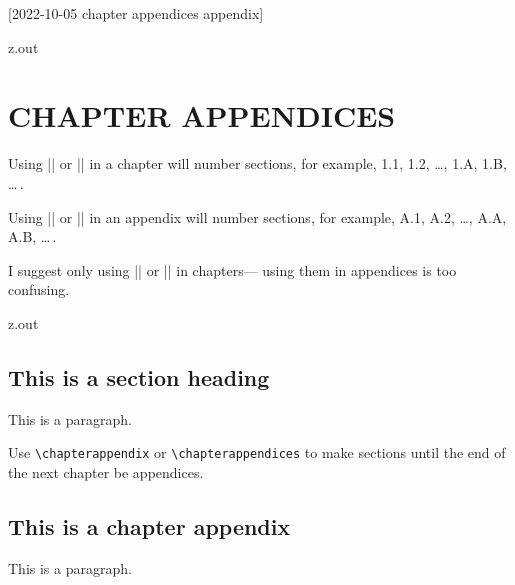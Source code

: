 [2022-10-05 chapter appendices appendix]

\begin{VerbatimOut}{z.out}
\chapter{CHAPTER APPENDICES}

Using |\chapterappendix|
or |\chapterappendices|
in a chapter will number sections,
for example,
1.1,
1.2,
\ldots,
1.A,
1.B,
\ldots\,.

Using |\chapterappendix|
or |\chapterappendices|
in an appendix will number sections,
for example,
A.1,
A.2,
\ldots,
A.A,
A.B,
\ldots\,.

I suggest only using |\chapterappendix|
or |\chapterappendices| in chapters---%
using them in appendices is too confusing.
\end{VerbatimOut}

\MyIO


\begin{VerbatimOut}{z.out}
\newpage


\section{This is a section heading}

This is a paragraph.

Use \verb+\chapterappendix+ or \verb+\chapterappendices+
to make sections until the end of the next chapter
be appendices.


\chapterappendix


\section{This is a chapter appendix}

This is a paragraph.
\end{VerbatimOut}

\MyIO
